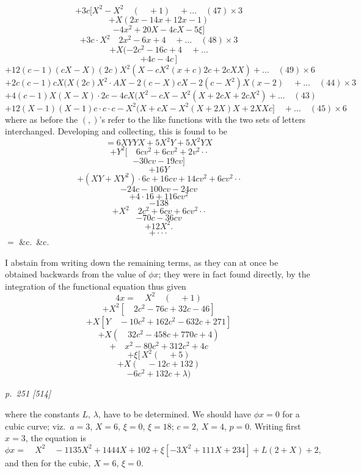 \documentclass[11pt,a4paper]{book}
\begin{document}
\noindent
\[
+ 3c[X^2 - X^2 \quad ( \quad +1) \quad + \ldots \quad (47) \times 3
\]
\[
+ X(2x - 14x + 12x - 1)
\]
\[
- 4x^2 + 20X - 4cX - 5\xi]
\]
\[
+ 3c \cdot X^2 \quad 2x^2 - 6x + 4 \quad + \ldots \quad (48) \times 3
\]
\[
+ X(-2c^2 - 16c + 4 \quad + \ldots
\]
\[
+ 4c - 4c\,]
\]
\[
+ 12(c - 1)(cX - X)(2c)X^2(X - cX^2(x + c)2c + 2cXX) + \ldots \quad (49) \times 6
\]
\[
+ 2c(c - 1)cX(X(2c)X^2 \cdot AX - 2(c - X)cX - 2(c - X^2)X(x - 2) \quad + \ldots \quad (44) \times 3
\]
\[
+ 4(c - 1)X(X - X) \cdot 2c - 4cX(X^2 - cX - X^2(X + 2cX + 2cX^2) + \ldots \quad (43)
\]
\[
+ 12(X - 1)(X - 1)c \cdot c \cdot c - X^2(X + cX - X^2(X + 2X)X + 2XXc] \quad + \ldots \quad (45) \times 6
\]
where as before the $(,)$'s refer to the like functions with the two sets of letters
interchanged.  Developing and collecting, this is found to be
\[
= 6XYY X + 5X^2 Y + 5X^2 Y X
\]
\[
+ Y^2 [ \quad 6cv^2 + 6cv^2 + 2v^2 \cdot \cdot
\]
\[
- 30cv - 19cv]
\]
\[
+ 16Y
\]
\[
+ (XY + XY^2) \cdot 6c + 16cv + 14cv^2 + 6cv^2 \cdot \cdot
\]
\[
- 24c - 100cv - 24cv
\]
\[
+ 4 \cdot 16 + 116cv^2
\]
\[
- 138
\]
\[
+ X^2 \quad 2c^2 + 6cv + 6cv^2 \cdot \cdot
\]
\[
- 70c - 36cv
\]
\[
+ 12X^2.
\]
\[
+ \cdot \cdot \cdot
\]
$ = $ \&c.\ \&c.

I abstain from writing down the remaining terms, as they can at once be obtained
backwards from the value of $\phi x$; they were in fact found directly, by the integration
of the functional equation thus given
\[
4x = \quad X^2 \quad ( \quad + 1)
\]
\[
+ X^2 [ \quad 2c^2 - 76c + 32c - 46]
\]
\[
+ X[Y \quad -10c^2 + 162c^2 - 632c + 271]
\]
\[
+ X (\quad 32c^2 - 458c + 770c + 4)
\]
\[
+ \quad x^2 - 80c^2 + 312c^2 + 4c
\]
\[
+ \xi [\, X^2 (\quad + 5)
\]
\[
+ X(\quad - 12c + 132)
\]
\[
- 6c^2 + 132c + \lambda)
\]

\clearpage

\bigskip
\textit{p.~251 [514]}
\smallskip

\noindent
where the constants $L$, $\lambda$, have to be determined.  We should have $\phi x = 0$ for a
cubic curve; viz.\ $a = 3$, $X = 6$, $\xi = 0$, $\xi = 18$; $c = 2$, $X = 4$, $p = 0$.  Writing first
$x = 3$, the equation is
\[
\phi x = \quad X^2 \quad - 1135X^2 + 1444X + 102 + \xi[-3X^2 + 111X + 234] + L(2 + X) + 2,
\]
and then for the cubic, $X = 6$, $\xi = 0$.
\end{document}
